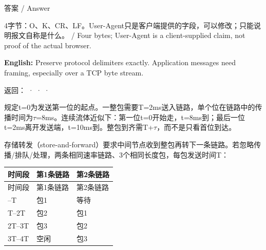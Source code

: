 \begin{StudySolution}{答案 / Answer}


4字节：O、K、CR、LF。User-Agent只是客户端提供的字段，可以修改；只能说明报文自称是什么。 / Four bytes; User-Agent is a client-supplied claim, not proof of the actual browser.


\end{StudySolution}


\textbf{English:} Preserve protocol delimiters exactly. Application messages need framing, especially over a TCP byte stream.


返回： ·  ·  · 








规定t=0为发送第一位的起点。一整包需要T=2ms送入链路，单个位在链路中的传播时间为\ensuremath{\tau}=8ms。连续流体近似下：第一位t=0开始走，t=8ms到；最后一位t=2ms离开发送端，t=10ms到。整包到齐需T+\ensuremath{\tau}，而不是只看首位到达。






存储转发（store-and-forward）要求中间节点收到整包再转下一条链路。若忽略传播/排队/处理，两条相同速率链路、3个相同长度包，每包发送时间T：


\begingroup
\small\setlength{\tabcolsep}{3pt}
\renewcommand{\arraystretch}{1.22}
\begin{longtable}{@{}>{\raggedright\arraybackslash}p{}>{\raggedright\arraybackslash}p{}>{\raggedright\arraybackslash}p{}@{}}
\toprule
时间段 & 第1条链路 & 第2条链路 \\
\midrule\endfirsthead
时间段 & 第1条链路 & 第2条链路 \\
\midrule\endhead
\bottomrule\endfoot
0–T & 包1 & 等待 \\
T–2T & 包2 & 包1 \\
2T–3T & 包3 & 包2 \\
3T–4T & 空闲 & 包3 \\
\end{longtable}
\endgroup


